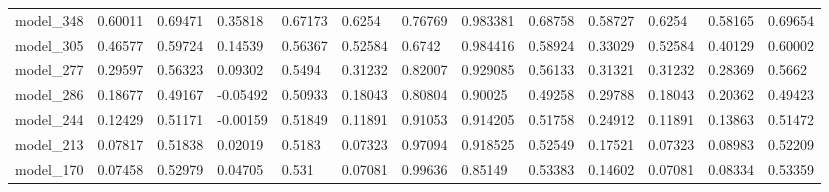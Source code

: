 \begin{tabular}{lllllllllllll}
model\_348 & 0.60011 & 0.69471 & 0.35818  & 0.67173 & 0.6254      & 0.76769     & 0.983381 & 0.68758  & 0.58727   & 0.6254  & 0.58165 & 0.69654 \\
model\_305 & 0.46577 & 0.59724 & 0.14539  & 0.56367 & 0.52584     & 0.6742      & 0.984416 & 0.58924  & 0.33029   & 0.52584 & 0.40129 & 0.60002 \\
model\_277 & 0.29597 & 0.56323 & 0.09302  & 0.5494  & 0.31232     & 0.82007     & 0.929085 & 0.56133  & 0.31321   & 0.31232 & 0.28369 & 0.5662  \\
model\_286 & 0.18677 & 0.49167 & -0.05492 & 0.50933 & 0.18043     & 0.80804     & 0.90025  & 0.49258  & 0.29788   & 0.18043 & 0.20362 & 0.49423 \\
model\_244 & 0.12429 & 0.51171 & -0.00159 & 0.51849 & 0.11891     & 0.91053     & 0.914205 & 0.51758  & 0.24912   & 0.11891 & 0.13863 & 0.51472 \\
model\_213 & 0.07817 & 0.51838 & 0.02019  & 0.5183  & 0.07323     & 0.97094     & 0.918525 & 0.52549  & 0.17521   & 0.07323 & 0.08983 & 0.52209 \\
model\_170 & 0.07458 & 0.52979 & 0.04705  & 0.531   & 0.07081     & 0.99636     & 0.85149  & 0.53383  & 0.14602   & 0.07081 & 0.08334 & 0.53359
\end{tabular}